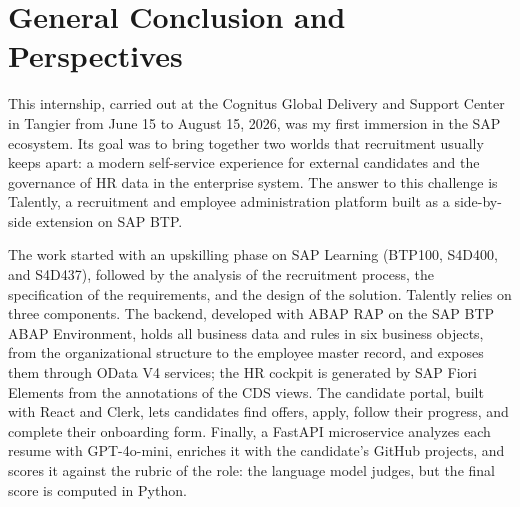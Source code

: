 \chapter*{General Conclusion and Perspectives}




\label{chap:General Conclusion}

This internship, carried out at the Cognitus Global Delivery and Support Center in Tangier from June 15 to August 15, 2026, was my first immersion in the SAP ecosystem. Its goal was to bring together two worlds that recruitment usually keeps apart: a modern self-service experience for external candidates and the governance of HR data in the enterprise system. The answer to this challenge is Talently, a recruitment and employee administration platform built as a side-by-side extension on SAP BTP.

The work started with an upskilling phase on SAP Learning (BTP100, S4D400, and S4D437), followed by the analysis of the recruitment process, the specification of the requirements, and the design of the solution. Talently relies on three components. The backend, developed with ABAP RAP on the SAP BTP ABAP Environment, holds all business data and rules in six business objects, from the organizational structure to the employee master record, and exposes them through OData V4 services; the HR cockpit is generated by SAP Fiori Elements from the annotations of the CDS views. The candidate portal, built with React and Clerk, lets candidates find offers, apply, follow their progress, and complete their onboarding form. Finally, a FastAPI microservice analyzes each resume with GPT-4o-mini, enriches it with the candidate's GitHub projects, and scores it against the rubric of the role: the language model judges, but the final score is computed in Python.


